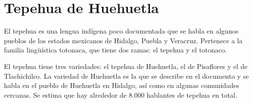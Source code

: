 \section*{Tepehua de Huehuetla}

\noindent El tepehua es una lengua indígena poco documentada que se habla en algunos pueblos de los estados mexicanos de Hidalgo, Puebla y Veracruz. Pertenece a la familia lingüística totonaca, que tiene dos ramas: el tepehua y el totonaco.

El tepehua tiene tres variedades: el tepehua de Huehuetla, el de Pisaflores y el de Tlachichilco. La variedad de Huehuetla es la que se describe en el documento y se habla en el pueblo de Huehuetla en Hidalgo, así como en algunas comunidades cercanas. Se estima que hay alrededor de 8.000 hablantes de tepehua en total. \vspace{0.5cm}

